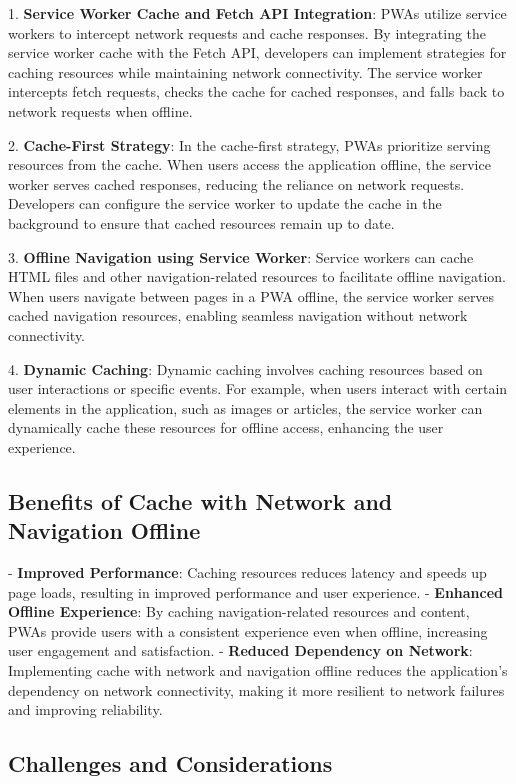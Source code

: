 \documentclass[12pt, a4paper, twoside]{article}
\begin{document}
1. \textbf{Service Worker Cache and Fetch API Integration}: PWAs utilize service workers to intercept network requests and cache responses. By integrating the service worker cache with the Fetch API, developers can implement strategies for caching resources while maintaining network connectivity. The service worker intercepts fetch requests, checks the cache for cached responses, and falls back to network requests when offline.

2. \textbf{Cache-First Strategy}: In the cache-first strategy, PWAs prioritize serving resources from the cache. When users access the application offline, the service worker serves cached responses, reducing the reliance on network requests. Developers can configure the service worker to update the cache in the background to ensure that cached resources remain up to date.

3. \textbf{Offline Navigation using Service Worker}: Service workers can cache HTML files and other navigation-related resources to facilitate offline navigation. When users navigate between pages in a PWA offline, the service worker serves cached navigation resources, enabling seamless navigation without network connectivity.

4. \textbf{Dynamic Caching}: Dynamic caching involves caching resources based on user interactions or specific events. For example, when users interact with certain elements in the application, such as images or articles, the service worker can dynamically cache these resources for offline access, enhancing the user experience.

\subsection{Benefits of Cache with Network and Navigation Offline}

- \textbf{Improved Performance}: Caching resources reduces latency and speeds up page loads, resulting in improved performance and user experience.
- \textbf{Enhanced Offline Experience}: By caching navigation-related resources and content, PWAs provide users with a consistent experience even when offline, increasing user engagement and satisfaction.
- \textbf{Reduced Dependency on Network}: Implementing cache with network and navigation offline reduces the application's dependency on network connectivity, making it more resilient to network failures and improving reliability.

\subsection{Challenges and Considerations}
\end{document}
